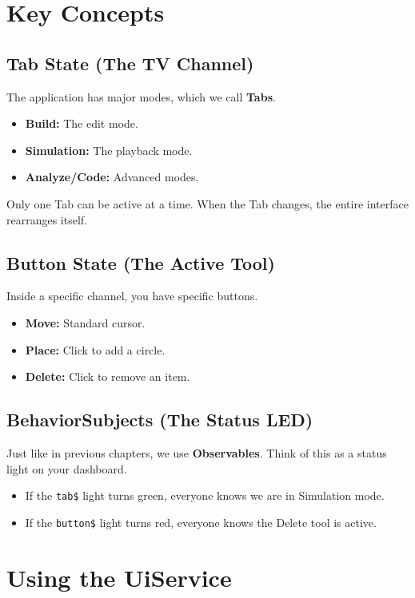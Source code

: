 \documentclass[a4paper,11pt,oneside]{report}
\begin{document}
\section{Key Concepts}

\subsection{Tab State (The TV Channel)}

The application has major modes, which we call \textbf{Tabs}.
\begin{itemize}
    \item \textbf{Build:} The edit mode.
    \item \textbf{Simulation:} The playback mode.
    \item \textbf{Analyze/Code:} Advanced modes.
\end{itemize}

Only one Tab can be active at a time. When the Tab changes, the entire interface rearranges itself.

\subsection{Button State (The Active Tool)}

Inside a specific channel, you have specific buttons.
\begin{itemize}
    \item \textbf{Move:} Standard cursor.
    \item \textbf{Place:} Click to add a circle.
    \item \textbf{Delete:} Click to remove an item.
\end{itemize}

\subsection{BehaviorSubjects (The Status LED)}

Just like in previous chapters, we use \textbf{Observables}. Think of this as a status light on your dashboard.
\begin{itemize}
    \item If the \texttt{tab\$} light turns green, everyone knows we are in Simulation mode.
    \item If the \texttt{button\$} light turns red, everyone knows the Delete tool is active.
\end{itemize}

\section{Using the UiService}
\end{document}
